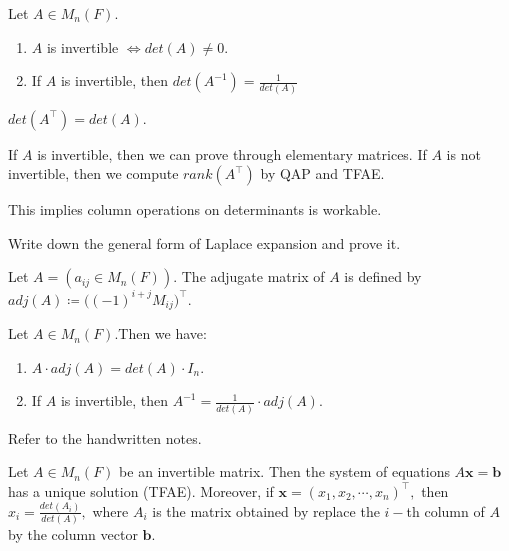 \documentclass[12pt]{article}
\begin{document}
\begin{theorem}
Let $A\in M_n(F).$
\begin{enumerate}
    \item $A$ is invertible $\Longleftrightarrow det(A)\neq 0$.
    \item If $A$ is invertible, then $det(A^{-1})=\frac{1}{det(A)}$
\end{enumerate}
\label{thm_5.6}
\end{theorem}

\begin{theorem}
    $det(A^\top)=det(A).$
\end{theorem}
\begin{pfbox}
    If $A$ is invertible, then we can prove through elementary matrices.
    If $A$ is not invertible, then we compute $rank(A^\top)$ by QAP and TFAE.
\end{pfbox}
This implies column operations on determinants is workable.


\begin{exercise}
    Write down the general form of Laplace expansion and prove it.
\end{exercise}


\begin{definition}
    Let $A=(a_{ij}\in M_n(F)).$
    The adjugate matrix of $A$ is defined by $adj(A)\coloneq\big((-1)^{i+j}M_{ij}\big)^\top.$
\end{definition}


\begin{theorem}
     Let $A\in M_n(F)$.Then we have:
     \begin{enumerate}
        \item $A\cdot adj(A)=det(A)\cdot I_n.$
        \item If $A$ is invertible, then $A^{-1}=\frac{1}{det(A)}\cdot adj(A).$
     \end{enumerate}
\end{theorem}
\begin{pfbox}
    Refer to the handwritten notes.
\end{pfbox}

\begin{theorem}
    Let $A\in M_n(F)$ be an invertible matrix. Then the system of equations 
    $A\mathbf{x}=\mathbf{b}$ has a unique solution (TFAE).
    Moreover, if $\mathbf{x}=(x_1,x_2,\cdots,x_n)^\top,$ then $x_i=\frac{det(A_i)}{det(A)},$
    where $A_i$ is the matrix obtained by replace the $i-$th column of $A$ by the column vector $\mathbf{b}.$
\end{theorem}
\end{document}
